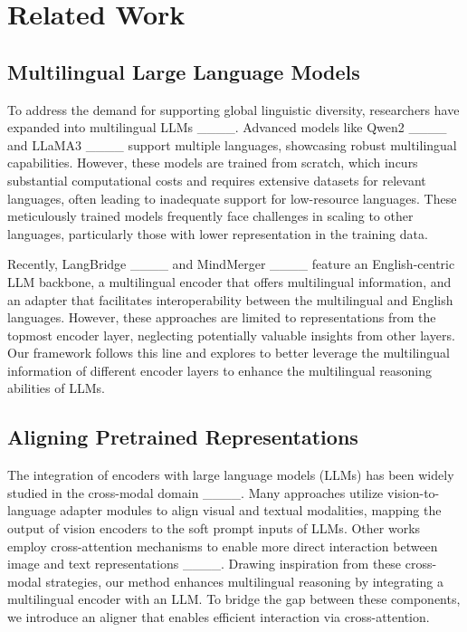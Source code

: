 \section{Related Work}
\subsection{Multilingual Large Language Models}

To address the demand for supporting global linguistic diversity, researchers have expanded into multilingual LLMs ____. Advanced models like Qwen2 ____ and LLaMA3 ____ support multiple languages, showcasing robust multilingual capabilities. However, these models are trained from scratch, which incurs substantial computational costs and requires extensive datasets for relevant languages, often leading to inadequate support for low-resource languages. These meticulously trained models frequently face challenges in scaling to other languages, particularly those with lower representation in the training data.

Recently, LangBridge ____ and MindMerger ____ feature an English-centric LLM backbone, a multilingual encoder that offers multilingual information, and an adapter that facilitates interoperability between the multilingual and English languages. However, these approaches are limited to representations from the topmost encoder layer, neglecting potentially valuable insights from other layers. Our \mname framework follows this line and explores to better leverage the multilingual information of different encoder layers to enhance the multilingual reasoning abilities of LLMs. 


\subsection{Aligning Pretrained Representations} 
The integration of encoders with large language models (LLMs) has been widely studied in the cross-modal domain ____. Many approaches utilize vision-to-language adapter modules to align visual and textual modalities, mapping the output of vision encoders to the soft prompt inputs of LLMs. Other works employ cross-attention mechanisms to enable more direct interaction between image and text representations ____. 
Drawing inspiration from these cross-modal strategies, our method enhances multilingual reasoning by integrating a multilingual encoder with an LLM. To bridge the gap between these components, we introduce an aligner that enables efficient interaction via cross-attention.